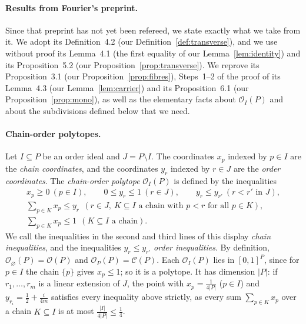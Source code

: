 \documentclass[11pt]{article}
\theoremstyle{definition}
\theoremstyle{remark}
\newcommand{\OO}{\mathcal O}
\newcommand{\CC}{\mathcal C}
\begin{document}
\paragraph{Results from Fourier's preprint.} Since that preprint has not yet been refereed, we state exactly what we
take from it. We adopt its Definition~4.2 (our Definition~\ref{def:transverse}), and we use without proof
its Lemma~4.1 (the first equality of our Lemma~\ref{lem:identity}) and its Proposition~5.2 (our
Proposition~\ref{prop:transverse}). We reprove its Proposition~3.1 (our Proposition~\ref{prop:fibres}),
Steps~1--2 of the proof of its Lemma~4.3 (our Lemma~\ref{lem:carrier}) and its Proposition~6.1 (our
Proposition~\ref{prop:mono}), as well as the elementary facts about $\OO_I(P)$ and about the subdivisions defined below that we need.

\paragraph{Chain-order polytopes.} Let $I\subseteq P$ be an order ideal and $J=P\setminus I$. The coordinates $x_p$ indexed by $p\in I$ are the \emph{chain coordinates}, and the coordinates $y_r$ indexed by $r\in J$ are the \emph{order coordinates}. The \emph{chain-order polytope}
$\OO_I(P)$ is defined by the
inequalities
\[
\begin{gathered}
x_p\geq0\ (p\in I),\qquad 0\leq y_r\leq1\ (r\in J),\qquad
y_r\leq y_{r'}\ (r<r' \text{ in } J),\\
\textstyle\sum_{p\in K}x_p\leq y_r\ \ (r\in J,\ K\subseteq I \text{ a
chain with } p<r \text{ for all } p\in K),\\
\textstyle\sum_{p\in K}x_p\leq1\ \ (K\subseteq I \text{ a chain}).
\end{gathered}
\]
We call the inequalities in the second and third lines of this display \emph{chain inequalities}, and the inequalities $y_r\leq y_{r'}$ \emph{order inequalities}. By definition, $\OO_\varnothing(P)=\OO(P)$ and $\OO_P(P)=\CC(P)$. Each $\OO_I(P)$ lies in $[0,1]^P$, since for $p\in I$ the chain $\{p\}$ gives $x_p\leq1$; so it is a polytope. It has dimension $|P|$: if
$r_1,\ldots,r_m$ is a linear extension of $J$, the point with $x_p=\frac1{4|P|}$ ($p\in I$) and
$y_{r_i}=\frac12+\frac{i}{4m}$ satisfies every inequality above strictly, as every sum $\sum_{p\in K}x_p$
over a chain $K\subseteq I$ is at most $\frac{|I|}{4|P|}\leq\frac14$.
\end{document}
